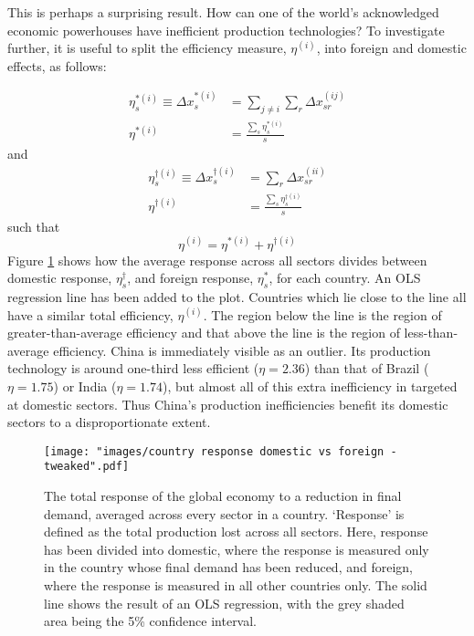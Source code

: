 \documentclass[a4paper]{article}
\begin{document}
This is perhaps a surprising result.
How can one of the world's acknowledged economic powerhouses have inefficient production technologies?
To investigate further, it is useful to split the efficiency measure, $\eta^{(i)}$, into foreign and domestic effects, as follows:

\begin{align}
\eta_s^{*(i)} \equiv \Delta x_{s}^{*(i)} & = 
	\sum_{j \neq i} \sum_r \Delta x_{sr}^{(ij)} \\
\eta^{*(i)} & = 
	\frac{\sum_s \eta_s^{*(i)}}{s}
\end{align}
and
\begin{align}
\eta_s^{\dagger(i)} \equiv \Delta x_{s}^{\dagger(i)} & = 
	\sum_r \Delta x_{sr}^{(ii)} \\
\eta^{\dagger(i)} & = 
	\frac{\sum_s \eta_s^{\dagger(i)}}{s}
\end{align}
such that
\begin{equation}
\eta^{(i)} = \eta^{*(i)} + \eta^{\dagger(i)}
\end{equation}
Figure \ref{fig:countries_domestic_vs_foreign} shows how the average response across all sectors divides between domestic response, $\eta_s^{\dagger}$, and foreign response, $\eta_s^{*}$, for each country. 
An OLS regression line has been added to the plot.
Countries which lie close to the line all have a similar total efficiency, $\eta^{(i)}$.
The region below the line is the region of greater-than-average efficiency and that above the line is the region of less-than-average efficiency.
China is immediately visible as an outlier.
Its production technology is around one-third less efficient ($\eta = 2.36$) than that of Brazil ($\eta = 1.75$) or India ($\eta = 1.74$), but almost all of this extra inefficiency in targeted at domestic sectors.
Thus China's production inefficiencies benefit its domestic sectors to a disproportionate extent.

\begin{figure}
\centering
\texttt{[image: "images/country response domestic vs foreign - tweaked".pdf]}
\caption{The total response of the global economy to a reduction in final demand, averaged across every sector in a country. 
`Response' is defined as the total production lost across all sectors.
Here, response has been divided into domestic, where the response is measured only in the country whose final demand has been reduced, and foreign, where the response is measured in all other countries only.
The solid line shows the result of an OLS regression, with the grey shaded area being the 5\% confidence interval.}
\label{fig:countries_domestic_vs_foreign}
\end{figure}
\end{document}
